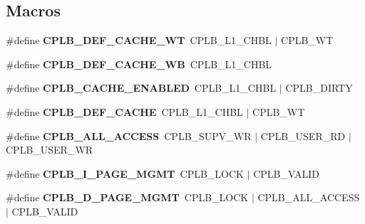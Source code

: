 \subsection*{Macros}
\begin{DoxyCompactItemize}
\item 
\mbox{\label{group__tll6527m__cplb_ga9b0439d011a5e1b22252426dc7e65b8e}} 
\#define {\bfseries C\+P\+L\+B\+\_\+\+D\+E\+F\+\_\+\+C\+A\+C\+H\+E\+\_\+\+WT}~C\+P\+L\+B\+\_\+\+L1\+\_\+\+C\+H\+BL $\vert$ C\+P\+L\+B\+\_\+\+WT
\item 
\mbox{\label{group__tll6527m__cplb_ga757daa324769dc29e8052e389e3bb9f2}} 
\#define {\bfseries C\+P\+L\+B\+\_\+\+D\+E\+F\+\_\+\+C\+A\+C\+H\+E\+\_\+\+WB}~C\+P\+L\+B\+\_\+\+L1\+\_\+\+C\+H\+BL
\item 
\mbox{\label{group__tll6527m__cplb_gacd77bd9a34a37c987bfd89fa4f9e3c22}} 
\#define {\bfseries C\+P\+L\+B\+\_\+\+C\+A\+C\+H\+E\+\_\+\+E\+N\+A\+B\+L\+ED}~C\+P\+L\+B\+\_\+\+L1\+\_\+\+C\+H\+BL $\vert$ C\+P\+L\+B\+\_\+\+D\+I\+R\+TY
\item 
\mbox{\label{group__tll6527m__cplb_gaf669ac4d569e54d709e7a875587cc36e}} 
\#define {\bfseries C\+P\+L\+B\+\_\+\+D\+E\+F\+\_\+\+C\+A\+C\+HE}~C\+P\+L\+B\+\_\+\+L1\+\_\+\+C\+H\+BL $\vert$ C\+P\+L\+B\+\_\+\+WT
\item 
\mbox{\label{group__tll6527m__cplb_ga3b0a7f17f5ffda4e86b07816ff399649}} 
\#define {\bfseries C\+P\+L\+B\+\_\+\+A\+L\+L\+\_\+\+A\+C\+C\+E\+SS}~C\+P\+L\+B\+\_\+\+S\+U\+P\+V\+\_\+\+WR $\vert$ C\+P\+L\+B\+\_\+\+U\+S\+E\+R\+\_\+\+RD $\vert$ C\+P\+L\+B\+\_\+\+U\+S\+E\+R\+\_\+\+WR
\item 
\mbox{\label{group__tll6527m__cplb_ga74715cacb2d597302ee1cd51d927967a}} 
\#define {\bfseries C\+P\+L\+B\+\_\+\+I\+\_\+\+P\+A\+G\+E\+\_\+\+M\+G\+MT}~C\+P\+L\+B\+\_\+\+L\+O\+CK $\vert$ C\+P\+L\+B\+\_\+\+V\+A\+L\+ID
\item 
\mbox{\label{group__tll6527m__cplb_gaeef3582727448ecf86e3e019d7caaaf1}} 
\#define {\bfseries C\+P\+L\+B\+\_\+\+D\+\_\+\+P\+A\+G\+E\+\_\+\+M\+G\+MT}~C\+P\+L\+B\+\_\+\+L\+O\+CK $\vert$ C\+P\+L\+B\+\_\+\+A\+L\+L\+\_\+\+A\+C\+C\+E\+SS $\vert$ C\+P\+L\+B\+\_\+\+V\+A\+L\+ID

\end{DoxyCompactItemize}
